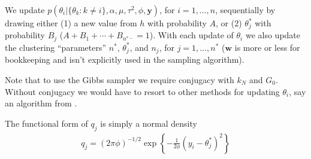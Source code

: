 \documentclass[12pt]{article}
\newcommand{\m}[1]{\mathbf{\bm{#1}}}
\begin{document}
\noindent We update $p(\theta_i|\{\theta_k:k\neq i\},\alpha,\mu,\tau^2,\phi,\m{y})$, for $i=1,\ldots,n$, sequentially by drawing either (1) a new value from $h$ with probability $A$, or (2) $\theta_j^*$ with probability $B_j$ ($A+B_1+\cdots+B_{n^{*-}}=1$). With each update of $\theta_i$ we also update the clustering ``parameters'' $n^*$, $\theta_j^*$, and $n_j$, for $j=1,\ldots,n^*$ ($\m{w}$ is more or less for bookkeeping and isn't explicitly used in the sampling algorithm).

Note that to use the Gibbs sampler we require conjugacy with $k_N$ and $G_0$. Without conjugacy we would have to resort to other methods for updating $\theta_i$, say an algorithm from \cite{neal2000markov}.

The functional form of $q_j$ is simply a normal density
\begin{align*}
q_j = (2\pi\phi)^{-1/2}\exp\left\{-\frac{1}{2\phi}(y_i - \theta_j^*)^2\right\}
\end{align*}
\end{document}
